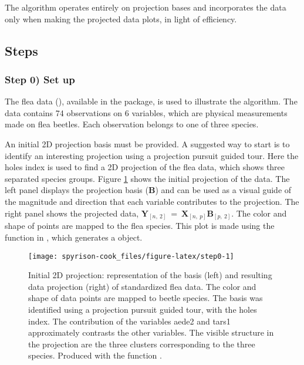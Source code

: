 The algorithm operates entirely on projection bases and incorporates the
data only when making the projected data plots, in light of efficiency.

\hypertarget{steps}{%
\subsection{Steps}\label{steps}}

\hypertarget{step-0-set-up}{%
\subsubsection{Step 0) Set up}\label{step-0-set-up}}

The flea data (\citet{lubischew_use_1962}), available in the 
package, is used to illustrate the algorithm. The data contains 74
observations on 6 variables, which are physical measurements made on
flea beetles. Each observation belongs to one of three species.

An initial 2D projection basis must be provided. A suggested way to
start is to identify an interesting projection using a projection
pursuit guided tour. Here the holes index is used to find a 2D
projection of the flea data, which shows three separated species groups.
Figure \ref{fig:step0} shows the initial projection of the data. The
left panel displays the projection basis (\(\textbf{B}\)) and can be
used as a visual guide of the magnitude and direction that each variable
contributes to the projection. The right panel shows the projected data,
\(\textbf{Y}_{[n,~2]} ~=~ \textbf{X}_{[n,~p]} \textbf{B}_{[p,~2]}\). The
color and shape of points are mapped to the flea species. This plot is
made using the  function in , which
generates a  \citep{wickham_ggplot2_2016} object.

\begin{Schunk}
\begin{figure}

{\centering \texttt{[image: spyrison-cook\_files/figure-latex/step0-1]} 

}

\caption[Initial 2D projection]{Initial 2D projection: representation of the basis (left) and resulting data projection (right) of standardized flea data. The color and shape of data points are mapped to beetle species. The basis was identified using a projection pursuit guided tour, with the holes index. The contribution of the variables aede2 and tars1 approximately contrasts the other variables. The visible structure in the projection are the three clusters corresponding to the three species. Produced with the function .}\label{fig:step0}
\end{figure}
\end{Schunk}

